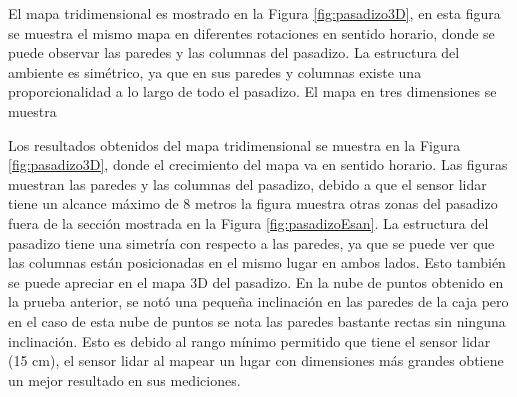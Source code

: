 El mapa tridimensional es mostrado en la Figura \ref{fig:pasadizo3D}, en esta figura se 
muestra el mismo mapa en diferentes rotaciones en sentido horario, donde se puede 
observar las paredes y las columnas del pasadizo. La estructura del ambiente es simétrico, 
ya que en sus paredes y columnas existe una proporcionalidad a lo largo de todo el pasadizo.
El mapa en tres dimensiones se muestra  

Los resultados obtenidos del mapa tridimensional se muestra en la Figura \ref{fig:pasadizo3D}, 
donde el crecimiento del mapa va en sentido horario. Las figuras muestran las paredes y las 
columnas del pasadizo, debido a que el sensor lidar tiene un alcance máximo de 8 metros la 
figura muestra otras zonas del pasadizo fuera de la sección mostrada en la Figura 
\ref{fig:pasadizoEsan}. La estructura del pasadizo tiene una simetría con respecto a las 
paredes, ya que se puede ver que las columnas están posicionadas en el mismo lugar en 
ambos lados. Esto también se puede apreciar en el mapa 3D del pasadizo. En la nube de puntos 
obtenido en la prueba anterior, se notó una pequeña inclinación en las paredes de la caja 
pero en el caso de esta nube de puntos se nota las paredes bastante rectas sin ninguna 
inclinación. Esto es debido al rango mínimo permitido que tiene el sensor lidar (15 cm), 
el sensor lidar al mapear un lugar con dimensiones más grandes obtiene un mejor resultado en 
sus mediciones.

